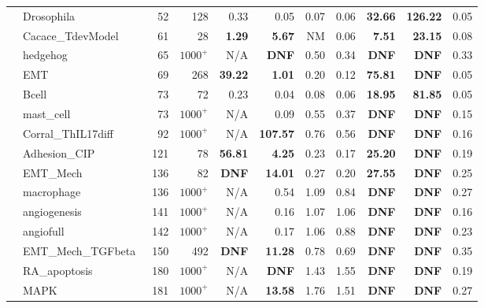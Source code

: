 \documentclass[preprint,12pt]{elsarticle}
\newcounter{rownumber}
\newcommand\rownb{\stepcounter{rownumber}\arabic{rownumber}}
\begin{document}
\begin{table}[!htb]
{\begin{tabular}{rlrrrrrrrrr}
    \rownb & Drosophila~\cite{RodrguezVega2014} & 52 & 128 & 0.33 & 0.05 & 0.07 & 0.06 & \textbf{32.66} & \textbf{126.22} & 0.05 \\
    \rownb & Cacace\_TdevModel~\cite{Cacace2020} & 61 & 28 & \textbf{1.29} & \textbf{5.67} & NM & 0.06 & \textbf{7.51} & \textbf{23.15} & 0.08 \\
    \rownb & hedgehog~\cite{DesignPrinciplesGeneNetworks} & 65 & $1000^+$ & N/A & \textbf{DNF} & 0.50 & 0.34 & \textbf{DNF} & \textbf{DNF} & 0.33 \\
    \rownb & EMT~\cite{Rozum2021} & 69 & 268 & \textbf{39.22} & \textbf{1.01} & 0.20 & 0.12 & \textbf{75.81} & \textbf{DNF} & 0.05 \\
    \rownb & Bcell~\cite{Dutta2019} & 73 & 72 & 0.23 & 0.04 & 0.08 & 0.06 & \textbf{18.95} & \textbf{81.85} & 0.05 \\
    \rownb & mast\_cell~\cite{aghamiri2020automated} & 73 & $1000^+$ & N/A & 0.09 & 0.55 & 0.37 & \textbf{DNF} & \textbf{DNF} & 0.15 \\
    \rownb & Corral\_ThIL17diff~\cite{corral2021interplay} & 92 & $1000^+$ & N/A & \textbf{107.57} & 0.76 & 0.56 & \textbf{DNF} & \textbf{DNF} & 0.16 \\

    \midrule %
     \rownb & Adhesion\_CIP~\cite{guberman2020boolean} & 121 & 78 & \textbf{56.81} & \textbf{4.25} & 0.23 & 0.17 & \textbf{25.20} & \textbf{DNF} & 0.19 \\
    \rownb & EMT\_Mech~\cite{Sullivan2022} & 136 & 82 & \textbf{DNF} & \textbf{14.01} & 0.27 & 0.20 & \textbf{27.55} & \textbf{DNF} & 0.25 \\
    \rownb & macrophage~\cite{DesignPrinciplesGeneNetworks} & 136 & $1000^+$ & N/A & 0.54 & 1.09 & 0.84 & \textbf{DNF} & \textbf{DNF} & 0.27 \\
    \rownb & angiogenesis~\cite{DesignPrinciplesGeneNetworks} & 141 & $1000^+$ & N/A & 0.16 & 1.07 & 1.06 & \textbf{DNF} & \textbf{DNF} & 0.16 \\
    \rownb & angiofull~\cite{Weinstein2017} & 142 & $1000^+$ & N/A & 0.17 & 1.06 & 0.88 & \textbf{DNF} & \textbf{DNF} & 0.23 \\
    \rownb & EMT\_Mech\_TGFbeta~\cite{Sullivan2022} & 150 & 492 & \textbf{DNF} & \textbf{11.28} & 0.78 & 0.69 & \textbf{DNF} & \textbf{DNF} & 0.35 \\
    \rownb & RA\_apoptosis~\cite{aghamiri2020automated} & 180 & $1000^+$ & N/A & \textbf{DNF} & 1.43 & 1.55 & \textbf{DNF} & \textbf{DNF} & 0.19 \\
    \rownb & MAPK~\cite{aghamiri2020automated} & 181 & $1000^+$ & N/A & \textbf{13.58} & 1.76 & 1.51 & \textbf{DNF} & \textbf{DNF} & 0.27 \\


\end{tabular}}
\end{table}
\end{document}
